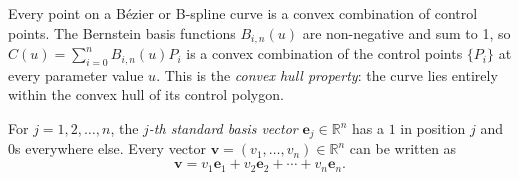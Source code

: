 \begin{remark*}
Every point on a Bézier or B-spline curve is a convex combination of control points.
The Bernstein basis functions $B_{i,n}(u)$ are non-negative and sum to 1,
so $C(u) = \sum_{i=0}^n B_{i,n}(u) P_i$ is a convex combination of the control
points $\{P_i\}$ at every parameter value $u$.
This is the \emph{convex hull property}: the curve lies entirely within the convex hull
of its control polygon.
\end{remark*}

\begin{tcolorbox}[colback=propbox, colframe=propborder, arc=2pt,
  left=6pt, right=6pt, top=4pt, bottom=4pt,
  title={\small\textbf{Definition (Standard Basis Vectors)}},
  fonttitle=\small\bfseries]
For $j = 1, 2, \ldots, n$, the \emph{$j$-th standard basis vector} $\mathbf{e}_j \in \mathbb{R}^n$
has a $1$ in position $j$ and $0$s everywhere else.
Every vector $\mathbf{v} = (v_1, \ldots, v_n) \in \mathbb{R}^n$ can be written as
\[
  \mathbf{v} = v_1 \mathbf{e}_1 + v_2 \mathbf{e}_2 + \cdots + v_n \mathbf{e}_n.
\]
\end{tcolorbox}
